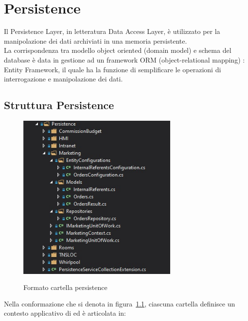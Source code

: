 \chapter{Persistence}
\label{chap:persistence}
Il Persistence Layer, in letteratura Data Access Layer, è utilizzato per la manipolazione dei dati archiviati in una memoria persistente.\\
La corrispondenza tra modello object oriented (domain model) e schema del database è data in gestione ad un framework ORM (object-relational mapping) \cite{EF}: Entity Framework, il quale ha la funzione di semplificare le operazioni di interrogazione e manipolazione dei dati.

\section{Struttura Persistence}
\begin{figure}[h!]
\begin{center}
  \includegraphics[width=8cm]{images/Persistence.jpg}\\
  \caption{Formato cartella persistence}\label{fig:persistence}
\end{center}
\end{figure}

Nella conformazione che si denota in figura~\ref{fig:persistence}, ciascuna cartella definisce un contesto applicativo di ed è articolata in:

